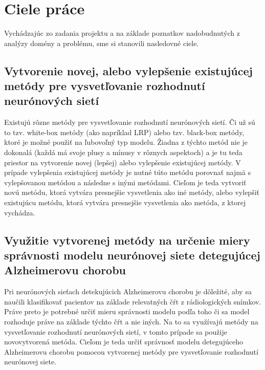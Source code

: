 \chapter{Ciele práce \label{sec:goals}}

Vychádzajúc zo zadania projektu a na základe poznatkov nadobudnutých z analýzy domény a problému, sme si stanovili nasledovné ciele.

\section{Vytvorenie novej, alebo vylepšenie existujúcej metódy pre vysvetľovanie rozhodnutí neurónových sietí \label{sec:goals_1}} 

Existujú rôzne metódy pre vysvetľovanie rozhodnutí neurónových sietí. Či už sú to tzv. white-box metódy (ako napríklad LRP) alebo tzv. black-box metódy, ktoré je možné použiť na ľubovoľný typ modelu. Žiadna z týchto metód nie je dokonalá (každá má svoje plusy a mínusy v rôznych aspektoch) a je tu teda priestor na vytvorenie novej (lepšej) alebo vylepšenie existujúcej metódy. V prípade vylepšenia existujúcej metódy je nutné túto metódu porovnať najmä s vylepšovanou metódou a následne s inými metódami. Cieľom je teda vytvoriť novú metódu, ktorá vytvára presnejšie vysvetlenia ako iné metódy, alebo vylepšiť existujúcu metódu, ktorá vytvára presnejšie vysvetlenia ako metóda, z ktorej vychádza.

\section{Využitie vytvorenej metódy na určenie miery správnosti modelu neurónovej siete detegujúcej Alzheimerovu chorobu \label{sec:goals_2}}

Pri neurónových sieťach detekujúcich Alzheimerovu chorobu je dôležité, aby sa naučili klasifikovať pacientov na základe relevatných čŕt z rádiologických snímkov. Práve preto je potrebné určiť mieru správnosti modelu podľa toho či sa model rozhoduje práve na základe týchto čŕt a nie iných. Na to sa využívajú metódy na vysvetľovanie rozhodnutí neurónových sietí, v tomto prípade sa použije novovytvorená metóda. Cieľom je teda určiť správnosť modelu detegujúceho Alzheimerovu chorobu pomocou vytvorenej metódy pre vysvetľovanie rozhodnutí neurónovej siete.
